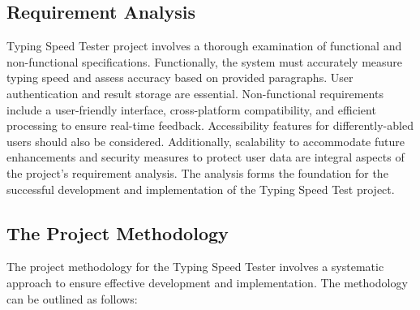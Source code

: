 \subsection{Requirement Analysis}
 Typing Speed Tester project involves a thorough examination of functional and non-functional specifications. Functionally, the system must accurately measure typing speed and assess accuracy based on provided paragraphs. User authentication and result storage are essential. Non-functional requirements include a user-friendly interface, cross-platform compatibility, and efficient processing to ensure real-time feedback. Accessibility features for differently-abled users should also be considered. Additionally, scalability to accommodate future enhancements and security measures to protect user data are integral aspects of the project's requirement analysis. The analysis forms the foundation for the successful development and implementation of the Typing Speed Test project.


\subsection{The Project Methodology}
The project methodology for the Typing Speed Tester involves a systematic approach to ensure effective development and implementation. The methodology can be outlined as follows:


